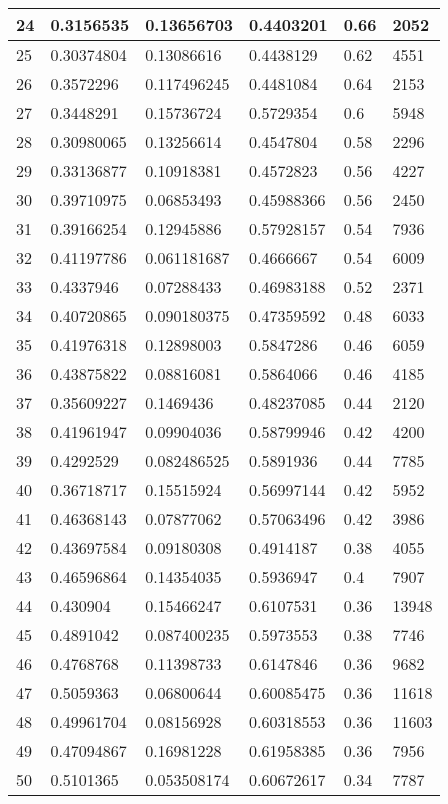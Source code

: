\begin{longtable}{|l|l|l|l|l|l|}
24 & 0.3156535 & 0.13656703 & 0.4403201 & 0.66 & 2052 \\ \hline 
25 & 0.30374804 & 0.13086616 & 0.4438129 & 0.62 & 4551 \\ \hline 
26 & 0.3572296 & 0.117496245 & 0.4481084 & 0.64 & 2153 \\ \hline 
27 & 0.3448291 & 0.15736724 & 0.5729354 & 0.6 & 5948 \\ \hline 
28 & 0.30980065 & 0.13256614 & 0.4547804 & 0.58 & 2296 \\ \hline 
29 & 0.33136877 & 0.10918381 & 0.4572823 & 0.56 & 4227 \\ \hline 
30 & 0.39710975 & 0.06853493 & 0.45988366 & 0.56 & 2450 \\ \hline 
31 & 0.39166254 & 0.12945886 & 0.57928157 & 0.54 & 7936 \\ \hline 
32 & 0.41197786 & 0.061181687 & 0.4666667 & 0.54 & 6009 \\ \hline 
33 & 0.4337946 & 0.07288433 & 0.46983188 & 0.52 & 2371 \\ \hline 
34 & 0.40720865 & 0.090180375 & 0.47359592 & 0.48 & 6033 \\ \hline 
35 & 0.41976318 & 0.12898003 & 0.5847286 & 0.46 & 6059 \\ \hline 
36 & 0.43875822 & 0.08816081 & 0.5864066 & 0.46 & 4185 \\ \hline 
37 & 0.35609227 & 0.1469436 & 0.48237085 & 0.44 & 2120 \\ \hline 
38 & 0.41961947 & 0.09904036 & 0.58799946 & 0.42 & 4200 \\ \hline 
39 & 0.4292529 & 0.082486525 & 0.5891936 & 0.44 & 7785 \\ \hline 
40 & 0.36718717 & 0.15515924 & 0.56997144 & 0.42 & 5952 \\ \hline 
41 & 0.46368143 & 0.07877062 & 0.57063496 & 0.42 & 3986 \\ \hline 
42 & 0.43697584 & 0.09180308 & 0.4914187 & 0.38 & 4055 \\ \hline 
43 & 0.46596864 & 0.14354035 & 0.5936947 & 0.4 & 7907 \\ \hline 
44 & 0.430904 & 0.15466247 & 0.6107531 & 0.36 & 13948 \\ \hline 
45 & 0.4891042 & 0.087400235 & 0.5973553 & 0.38 & 7746 \\ \hline 
46 & 0.4768768 & 0.11398733 & 0.6147846 & 0.36 & 9682 \\ \hline 
47 & 0.5059363 & 0.06800644 & 0.60085475 & 0.36 & 11618 \\ \hline 
48 & 0.49961704 & 0.08156928 & 0.60318553 & 0.36 & 11603 \\ \hline 
49 & 0.47094867 & 0.16981228 & 0.61958385 & 0.36 & 7956 \\ \hline 
50 & 0.5101365 & 0.053508174 & 0.60672617 & 0.34 & 7787 \\ \hline 
\end{longtable}